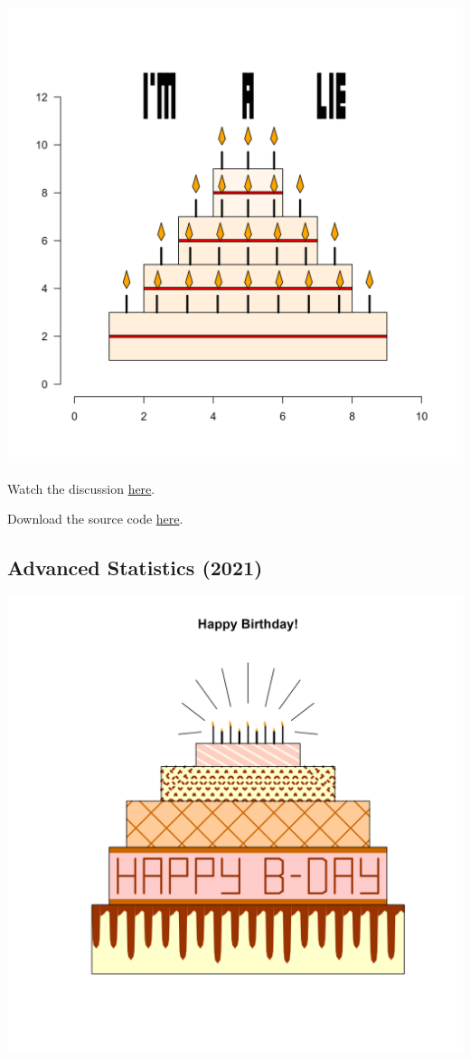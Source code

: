 \documentclass[
]{book}
\begin{document}
\includegraphics[width=28in]{figures/R2022cake}

Watch the discussion \href{https://youtu.be/uXfoIKguqME}{here}.

Download the source code \href{files/cake-winner-R-2022.Rmd}{here}.

\hypertarget{advanced-statistics-2021}{%
\subsection*{Advanced Statistics (2021)}\label{advanced-statistics-2021}}

\includegraphics[width=28in]{figures/AS2022cake}
\end{document}
